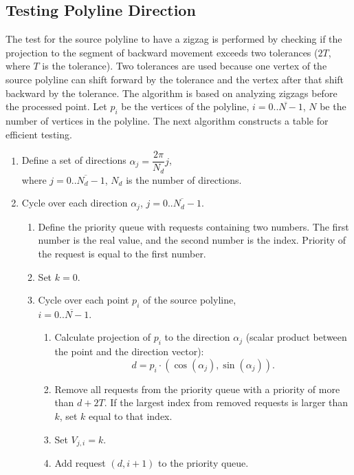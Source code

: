 \documentclass[conference]{IEEEtran}
\begin{document}
\subsection
{
  Testing Polyline Direction
  \label{sec:TestingZigZag}
}

The test for the source polyline to have a zigzag is performed by checking if the projection to the segment of backward movement exceeds two tolerances ($2 T$, where $T$ is the tolerance). Two tolerances are used because one vertex of the source polyline can shift forward by the tolerance and the vertex after that shift backward by the tolerance. The algorithm is based on analyzing zigzags before the processed point. Let $p_i$ be the vertices of the polyline, $i = \overline{0..N - 1}$, $N$ be the number of vertices in the polyline. The next algorithm constructs a table for efficient testing.
\begin{enumerate}[label={}]
  \item Define a set of directions $\alpha_j = \dfrac{2 \pi}{N_d} j$,\\
  where $j = \overline{0..N_d - 1}$, $N_d$ is the number of directions.
  \item Cycle over each direction $\alpha_j$, $j = \overline{0..N_d - 1}$.
  \begin{enumerate}[label={}]
    \item Define the priority queue with requests containing two numbers. The first number is the real value, and the second number is the index. Priority of the request is equal to the first number.
    \item Set $k = 0$.
    \item Cycle over each point $p_i$ of the source polyline,\\
    $i = \overline{0..N - 1}$.
    \begin{enumerate}[label={}]
      \item Calculate projection of $p_i$ to the direction $\alpha_j$ (scalar product between the point and the direction vector):
      \begin{equation*}
        d = p_i \cdot \left( \cos \left( \alpha_j \right), \sin \left( \alpha_j \right) \right).
      \end{equation*}
      \item Remove all requests from the priority queue with a priority of more than $d + 2 T$. If the largest index from removed requests is larger than $k$, set $k$ equal to that index.
      \item Set $V_{j, i} = k$.
      \item Add request $\left( d, i + 1 \right)$ to the priority queue.
    \end{enumerate}
  \end{enumerate}
\end{enumerate}
\end{document}
